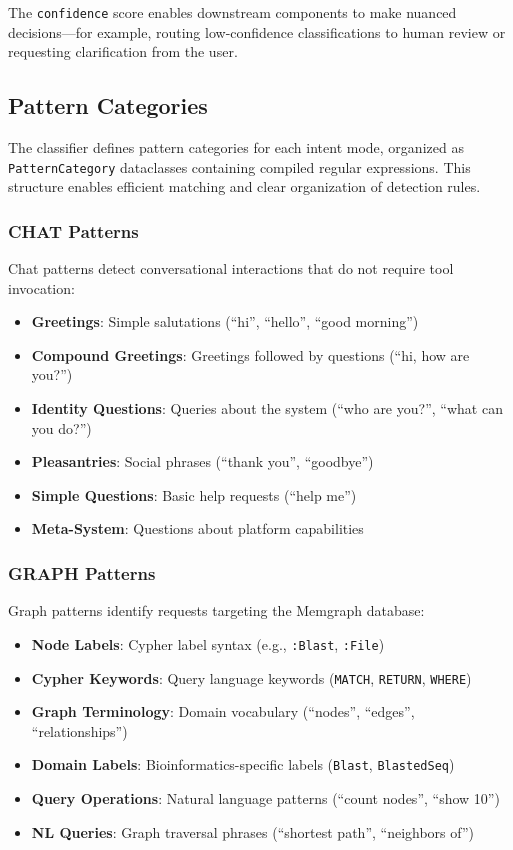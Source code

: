 \documentclass[a4paper,twoside]{sapthesis}
\begin{document}
The \texttt{confidence} score enables downstream components to make nuanced decisions---for example, routing low-confidence classifications to human review or requesting clarification from the user.

\subsection{Pattern Categories}

The classifier defines pattern categories for each intent mode, organized as \texttt{PatternCategory} dataclasses containing compiled regular expressions. This structure enables efficient matching and clear organization of detection rules.

\subsubsection{CHAT Patterns}

Chat patterns detect conversational interactions that do not require tool invocation:

\begin{itemize}
    \item \textbf{Greetings}: Simple salutations (``hi'', ``hello'', ``good morning'')
    \item \textbf{Compound Greetings}: Greetings followed by questions (``hi, how are you?'')
    \item \textbf{Identity Questions}: Queries about the system (``who are you?'', ``what can you do?'')
    \item \textbf{Pleasantries}: Social phrases (``thank you'', ``goodbye'')
    \item \textbf{Simple Questions}: Basic help requests (``help me'')
    \item \textbf{Meta-System}: Questions about platform capabilities
\end{itemize}

\subsubsection{GRAPH Patterns}

Graph patterns identify requests targeting the Memgraph database:

\begin{itemize}
    \item \textbf{Node Labels}: Cypher label syntax (e.g., \texttt{:Blast}, \texttt{:File})
    \item \textbf{Cypher Keywords}: Query language keywords (\texttt{MATCH}, \texttt{RETURN}, \texttt{WHERE})
    \item \textbf{Graph Terminology}: Domain vocabulary (``nodes'', ``edges'', ``relationships'')
    \item \textbf{Domain Labels}: Bioinformatics-specific labels (\texttt{Blast}, \texttt{BlastedSeq})
    \item \textbf{Query Operations}: Natural language patterns (``count nodes'', ``show 10'')
    \item \textbf{NL Queries}: Graph traversal phrases (``shortest path'', ``neighbors of'')
\end{itemize}
\end{document}
